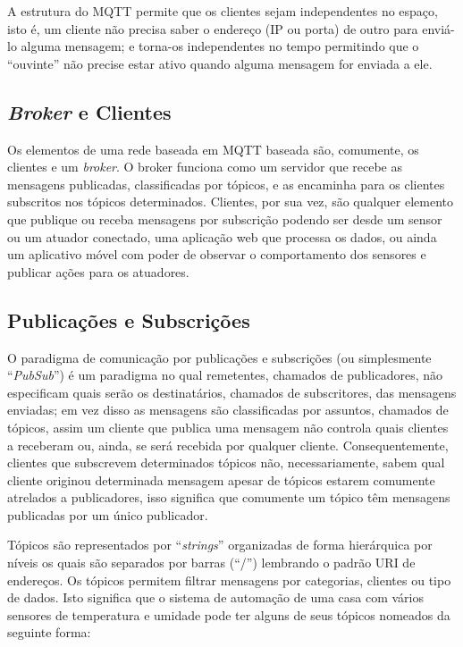 A estrutura do MQTT permite que os clientes sejam independentes no espaço, isto é, um cliente não precisa saber o endereço (IP ou porta) de outro para enviá-lo alguma mensagem; e torna-os independentes no tempo permitindo que o “ouvinte” não precise estar ativo quando alguma mensagem for enviada a ele.

\subsection{\textit{Broker} e Clientes}

Os elementos de uma rede baseada em MQTT baseada são, comumente, os clientes e um \textit{broker}. O broker funciona como um servidor que recebe as mensagens publicadas, classificadas por tópicos, e as encaminha para os clientes subscritos nos tópicos determinados. Clientes, por sua vez, são qualquer elemento que publique ou receba mensagens por subscrição podendo ser desde um sensor ou um atuador conectado, uma aplicação web que processa os dados, ou ainda um aplicativo móvel com poder de observar o comportamento dos sensores e publicar ações para os atuadores.

\subsection{Publicações e Subscrições}

O paradigma de comunicação por publicações e subscrições (ou simplesmente “\textit{PubSub}”) é um paradigma no qual remetentes, chamados de publicadores, não especificam quais serão os destinatários, chamados de subscritores, das mensagens enviadas; em vez disso as mensagens são classificadas por assuntos, chamados de tópicos, assim um cliente que publica uma mensagem não controla quais clientes a receberam ou, ainda, se será recebida por qualquer cliente. Consequentemente, clientes que subscrevem determinados tópicos não, necessariamente, sabem qual cliente originou determinada mensagem apesar de tópicos estarem comumente atrelados a publicadores, isso significa que comumente um tópico têm mensagens publicadas por um único publicador.

Tópicos são representados por “\textit{strings}” organizadas de forma hierárquica por níveis os quais são separados por barras (“/”) lembrando o padrão URI de endereços. Os tópicos permitem filtrar mensagens por categorias, clientes ou tipo de dados. Isto significa que o sistema de automação de uma casa com vários sensores de temperatura e umidade pode ter alguns de seus tópicos nomeados da seguinte forma:

